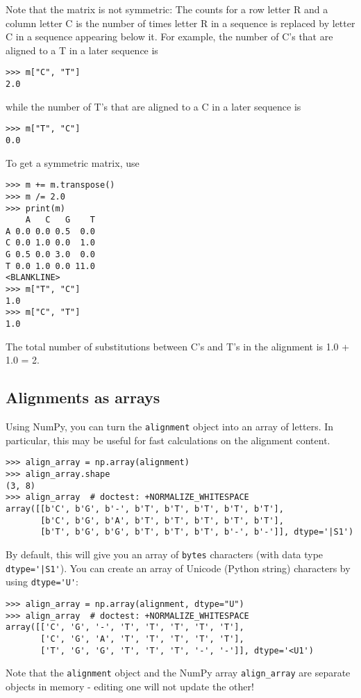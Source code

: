 Note that the matrix is not symmetric: The counts for a row letter R and a column letter C is the number of times letter R in a sequence is replaced by letter C in a sequence appearing below it. For example, the number of C's that are aligned to a T in a later sequence is
\begin{verbatim}
>>> m["C", "T"]
2.0
\end{verbatim}
while the number of T's that are aligned to a C in a later sequence is
\begin{verbatim}
>>> m["T", "C"]
0.0
\end{verbatim}
To get a symmetric matrix, use
\begin{verbatim}
>>> m += m.transpose()
>>> m /= 2.0
>>> print(m)
    A   C   G    T
A 0.0 0.0 0.5  0.0
C 0.0 1.0 0.0  1.0
G 0.5 0.0 3.0  0.0
T 0.0 1.0 0.0 11.0
<BLANKLINE>
>>> m["T", "C"]
1.0
>>> m["C", "T"]
1.0
\end{verbatim}
The total number of substitutions between C's and T's in the alignment is 1.0 + 1.0 = 2.

\subsection{Alignments as arrays}

Using NumPy, you can turn the \verb+alignment+ object into an array of letters. In particular, this may be useful for fast calculations on the alignment content.
\begin{verbatim}
>>> align_array = np.array(alignment)
>>> align_array.shape
(3, 8)
>>> align_array  # doctest: +NORMALIZE_WHITESPACE
array([[b'C', b'G', b'-', b'T', b'T', b'T', b'T', b'T'],
       [b'C', b'G', b'A', b'T', b'T', b'T', b'T', b'T'],
       [b'T', b'G', b'G', b'T', b'T', b'T', b'-', b'-']], dtype='|S1')
\end{verbatim}
By default, this will give you an array of \verb|bytes| characters (with data type \verb+dtype='|S1'+). You can create an array of Unicode (Python string) characters by using \verb+dtype='U'+:
\begin{verbatim}
>>> align_array = np.array(alignment, dtype="U")
>>> align_array  # doctest: +NORMALIZE_WHITESPACE
array([['C', 'G', '-', 'T', 'T', 'T', 'T', 'T'],
       ['C', 'G', 'A', 'T', 'T', 'T', 'T', 'T'],
       ['T', 'G', 'G', 'T', 'T', 'T', '-', '-']], dtype='<U1')
\end{verbatim}
Note that the \verb+alignment+ object and the NumPy array \verb|align_array| are separate objects in memory - editing one will not update the other!

